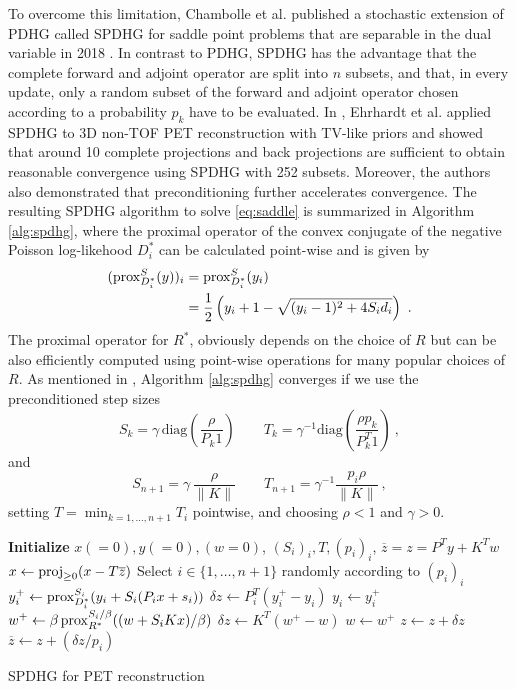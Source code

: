 To overcome this limitation, Chambolle et al. published a stochastic extension of PDHG called SPDHG 
for saddle point problems that are separable in the dual variable in 2018 \cite{Chambolle2018}.
In contrast to PDHG, SPDHG has the advantage that the complete forward and adjoint operator are
split into $n$ subsets, and that, in every update, only a random subset of the forward
and adjoint operator chosen according to a probability $p_k$ have to be evaluated.
In \cite{Ehrhardt2019}, Ehrhardt et al. applied SPDHG to 3D non-TOF PET reconstruction with TV-like
priors and showed that around 10 complete projections and back projections are sufficient 
to obtain reasonable convergence using SPDHG with 252 subsets.
Moreover, the authors also demonstrated that preconditioning further accelerates convergence.
The resulting SPDHG algorithm to solve \eqref{eq:saddle} is summarized in Algorithm \ref{alg:spdhg},
where the proximal operator of the convex conjugate of the negative Poisson log-likehood $D_i^*$ 
can be calculated point-wise and is given by
%
\begin{equation}
\begin{split}
(\operatorname{prox}_{D_i^*}^{S}(y))_i &= \operatorname{prox}_{D_i^*}^{S}(y_i) \\ 
&= \frac{1}{2} \left(y_i + 1 - \sqrt{ (y_i-1)^2 + 4 S_i d_i} \right) \ .
\end{split}
\label{eq:proxD}
\end{equation} 
%
The proximal operator for $R^*$, obviously depends on the choice of $R$ but can be also efficiently 
computed using point-wise operations for many popular choices of $R$.
As mentioned in \cite{Ehrhardt2019}, Algorithm \ref{alg:spdhg} converges if we use the preconditioned
step sizes
%
\[ S_k = \gamma \, \text{diag}(\frac{\rho}{P_k 1} )\qquad  T_k = \gamma^{-1} \text{diag}(\frac{\rho p_k}{P^T_k 1}) \ , \]
% 
and
%
\[ S_{n+1} = \gamma \, \frac{\rho}{\|K\|} \qquad T_{n+1} = \gamma^{-1} \frac{p_i\rho}{\|K\|} \ , \]
%
setting $T = \min_{k=1,\ldots,n+1} T_i$ pointwise, and choosing $\rho<1$ and $\gamma>0$.
%
\begin{algorithm}[t]
\begin{algorithmic}[1]
\small
\State \textbf{Initialize} $x(=0),y(=0),(w=0)$, $(S_i)_i,T,(p_i)_i$,
\State $\overline{z} = z = P^T y + K^T w$
\Repeat
	\State $x \gets \operatorname{proj}_{\geq 0} (x - T \overline{z})$
	\State Select $i \in \{ 1,\ldots,n+1\} $ randomly according to $(p_i)_i$
	\State $y_i^+ \gets \operatorname{prox}_{D_i^*}^{S_i} ( y_i + S_i  ( P_i x + s_i))$
	\State $\delta z \gets P_i^T (y_i^+ - y_i)$
	\State $y_i \gets y_i^+$
  \Else
	\State $w^+ \gets \beta \operatorname{prox}_{R^*}^{S_i/\beta} ((w + S_i  K x)/\beta)$
	\State $\delta z \gets K^T (w^+ - w)$
	\State $w \gets w^+$
  \EndIf
	\State $z \gets z + \delta z$
	\State $\overline{z} \gets  z + (\delta z/p_i)$
\State {}
\end{algorithmic}
\caption{SPDHG for PET reconstruction \cite{Ehrhardt2019}}
\label{alg:spdhg}
\end{algorithm}
%

